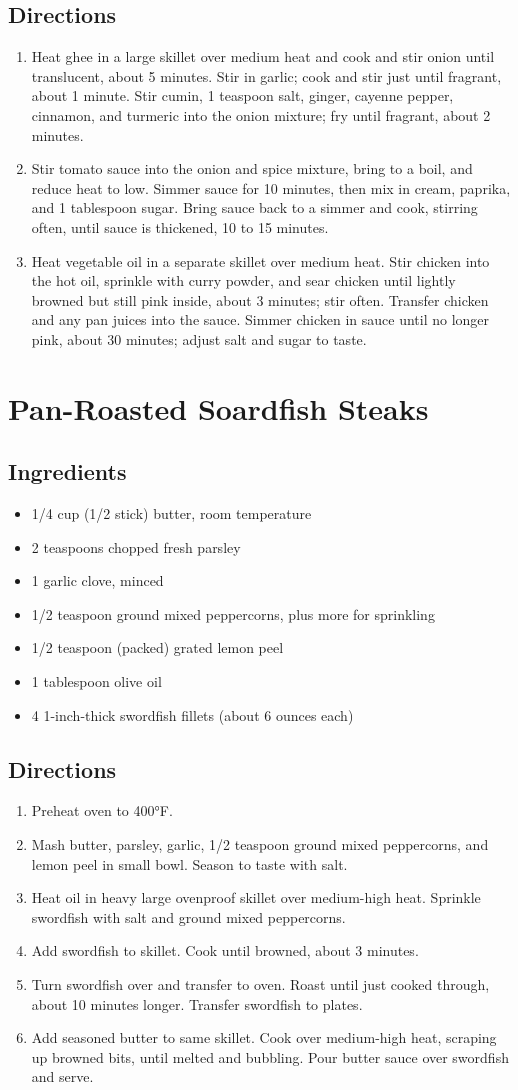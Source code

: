 \documentclass[oneside,11pt]{book}
\newcommand{\Ingredients}[1]{
    \subsection*{Ingredients}
    \begin{itemize} 
      #1 
    \end{itemize}
}
\newcommand{\Directions}[1]{
    \subsection*{Directions}
    \begin{enumerate} 
      #1 
    \end{enumerate}
}
\newcommand{\recipe}[1]{
    \section*{ \hspace{-12pt} #1 }
    \addcontentsline{toc}{section}{ \hspace{-6pt} #1 }
}
\begin{document}
        \Directions{
            \item Heat ghee in a large skillet over medium heat and cook and stir onion until translucent, about 5 minutes. 
                Stir in garlic; cook and stir just until fragrant, about 1 minute. 
                Stir cumin, 1 teaspoon salt, ginger, cayenne pepper, cinnamon, and turmeric into the onion mixture; 
                fry until fragrant, about 2 minutes.
            \item Stir tomato sauce into the onion and spice mixture, bring to a boil, and reduce heat to low.
                Simmer sauce for 10 minutes, then mix in cream, paprika, and 1 tablespoon sugar. 
                Bring sauce back to a simmer and cook, stirring often, until sauce is thickened, 10 to 15 minutes.
            \item Heat vegetable oil in a separate skillet over medium heat. 
                Stir chicken into the hot oil, sprinkle with curry powder, and sear chicken until lightly browned but still pink inside, about 3 minutes; stir often. 
                Transfer chicken and any pan juices into the sauce. 
                Simmer chicken in sauce until no longer pink, about 30 minutes; adjust salt and sugar to taste.
        }
    
    \recipe{Pan-Roasted Soardfish Steaks}
        \Ingredients{
            \item 1/4 cup (1/2 stick) butter, room temperature
            \item 2 teaspoons chopped fresh parsley
            \item 1 garlic clove, minced
            \item 1/2 teaspoon ground mixed peppercorns, plus more for sprinkling
            \item 1/2 teaspoon (packed) grated lemon peel
            \item 1 tablespoon olive oil
            \item 4 1-inch-thick swordfish fillets (about 6 ounces each)
        }
        
        \Directions{
            \item Preheat oven to 400°F. 
            \item Mash butter, parsley, garlic, 1/2 teaspoon ground mixed peppercorns, and lemon peel in small bowl. 
                Season to taste with salt.
            \item Heat oil in heavy large ovenproof skillet over medium-high heat. 
                Sprinkle swordfish with salt and ground mixed peppercorns. 
            \item Add swordfish to skillet. 
                Cook until browned, about 3 minutes. 
            \item Turn swordfish over and transfer to oven. 
                Roast until just cooked through, about 10 minutes longer. 
                Transfer swordfish to plates. 
            \item Add seasoned butter to same skillet. 
                Cook over medium-high heat, scraping up browned bits, until melted and bubbling. 
                Pour butter sauce over swordfish and serve.
        }
    
\end{document}
